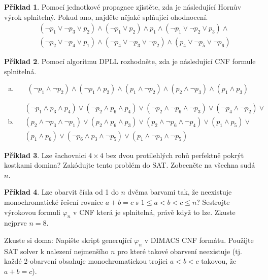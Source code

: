 \documentclass[a4paper]{article}
\theoremstyle{definition}
\newtheorem{problem}{Příklad}
\begin{document}
\medskip\begin{problem}
Pomocí jednotkové propagace zjistěte, zda je následující Hornův výrok splnitelný. Pokud ano, najděte nějaké splňující ohodnocení.
\begin{align*}
    &(\neg p_1 \vee \neg p_3 \vee p_2)\wedge(\neg p_1 \vee p_2)\wedge p_1 \wedge (\neg p_1 \vee \neg p_2 \vee p_3)\wedge \\
    &(\neg p_2 \vee \neg p_4 \vee p_1)\wedge(\neg p_4 \vee \neg p_3 \vee \neg p_2)\wedge(p_4\vee \neg p_5 \vee\neg p_6)
\end{align*}
\end{problem}
    

\medskip\begin{problem}
    Pomocí algoritmu DPLL rozhodněte, zda je následující CNF formule splnitelná.
    \begin{enumerate}[(a)]
        \item $$ (\neg p_1 \wedge \neg p_2)\land( \neg p_1 \wedge p_2)\land( p_1 \wedge \neg p_2)\land( p_2 \wedge \neg p_3)\land( p_1 \wedge p_3)$$
        \item \begin{align*}
            &(\neg p_1 \wedge p_3 \wedge p_4)\vee( \neg p_2 \wedge p_6 \wedge p_4)\vee( \neg p_2 \wedge \neg p_6 \wedge \neg p_3)\vee(
                \neg p_4 \wedge \neg p_2)\vee \\ & ( p_2 \wedge \neg p_3 \wedge \neg p_1)\vee ( p_2 \wedge p_6 \wedge p_3)\vee
                ( p_2 \wedge \neg p_6 \wedge \neg p_4)\vee
                ( p_1 \wedge p_5)\vee \\ & ( p_1 \wedge p_6)\vee(
                \neg p_6 \wedge p_3 \wedge \neg p_5)\vee( p_1 \wedge \neg p_3 \wedge \neg p_5)    
        \end{align*}
    \end{enumerate}
\end{problem}


\medskip\begin{problem}
Lze šachovnici $4\times 4$ bez dvou protilehlých rohů perfektně pokrýt kostkami domina? Zakódujte tento problém do SAT. Zobecněte na všechna sudá~$n$.
\end{problem}
    
    
\medskip\begin{problem}
    Lze obarvit čísla od 1 do $n$ dvěma barvami tak, že neexistuje monochromatické řešení rovnice
    $a+b=c$ s $1\leq a<b<c\leq n$? Sestrojte výrokovou formuli $\varphi_n$ v CNF která je splnitelná, právě když to lze. Zkuste nejprve $n=8$.
    
    Zkuste si doma: Napište skript generující $\varphi_n$ v DIMACS CNF formátu. Použijte SAT solver k nalezení nejmenšího $n$ pro které takové obarvení neexistuje (tj. každé 2-obarvení obsahuje monochromatickou trojici $a<b<c$ takovou, že $a+b=c$).
\end{problem}
\end{document}

